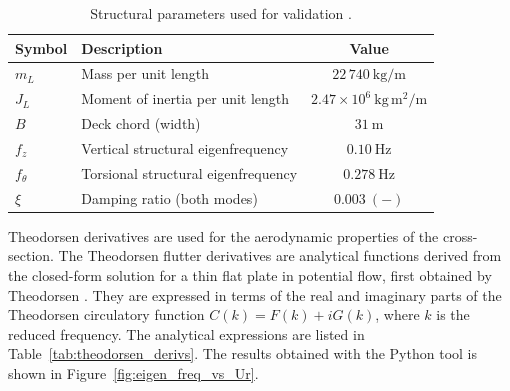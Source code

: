 \documentclass[../main]{subfiles}
\begin{document}
\begin{table}[htbp]
    \centering
    \caption{Structural parameters used for validation \cite{diana2020}.}
    \label{tab:structural_params}
    \begin{tabular}{|l|l|c|}
        \hline
        \textbf{Symbol} & \textbf{Description} & \textbf{Value} \\
        \hline
        $m_L$            & Mass per unit length                          & $22\,740\ \mathrm{kg/m}$      \\
        \hline
        $J_L$            & Moment of inertia per unit length             & $2.47\times10^6\ \mathrm{kg\,m^2/m}$ \\
        \hline
        $B$              & Deck chord (width)                            & $31\ \mathrm{m}$              \\
        \hline
        $f_z$            & Vertical structural eigenfrequency            & $0.10\ \mathrm{Hz}$           \\
        \hline
        $f_\theta$       & Torsional structural eigenfrequency           & $0.278\ \mathrm{Hz}$          \\
        \hline
        $\xi$            & Damping ratio (both modes)                    & $0.003\ (-)$                  \\
        \hline
    \end{tabular}
\end{table}

Theodorsen derivatives are used for the aerodynamic properties
of the cross-section. The Theodorsen flutter derivatives are analytical functions
derived from the closed-form solution for a thin flat plate in potential flow,
first obtained by Theodorsen \cite{TheodorsenGarrick1934}. They are expressed in terms
of the real and imaginary parts of the Theodorsen circulatory function
\(C(k) = F(k) + iG(k)\), where \(k\) is the reduced frequency. The analytical
expressions are listed in Table~\ref{tab:theodorsen_derivs}. The results obtained with the Python tool is shown in
Figure~\ref{fig:eigen_freq_vs_Ur}. \\
\end{document}
